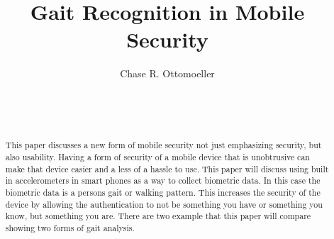 \documentclass{sig-alternate}
\begin{document}

\title{Gait Recognition in Mobile Security}


\author{
\alignauthor
Chase R. Ottomoeller\\
	\\
	\\
	\\
}

\maketitle
\begin{abstract}
This paper discusses a new form of mobile security not just emphasizing security, but also usability. Having a form of security of a mobile device that is unobtrusive can make that device easier and a less of a hassle to use. This paper will discuss using built in accelerometers in smart phones as a way to collect biometric data. In this case the biometric data is a persons gait or walking pattern. This increases the security of the device by allowing the authentication to not be something you have or something you know, but something you are. There are two example that this paper will compare showing two forms of gait analysis. 
\end{abstract}

\end{document}
